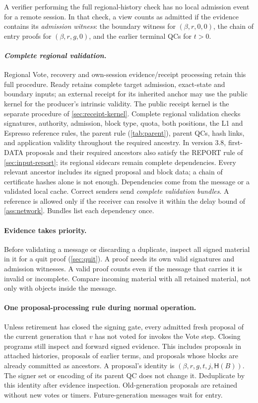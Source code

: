 \documentclass[11pt,a4paper]{article}
\newcommand{\Hash}{\mathsf H}
\newcommand{\defterm}[1]{\textcolor{rrBlue}{\textit{#1}}}
\begin{document}
A verifier performing the full regional-history check has no local
admission event for a remote session. In that check, a view counts as
admitted if the evidence contains
its \defterm{admission witness}: the boundary witness for $(\beta,r,0,0)$, the chain of
entry proofs for $(\beta,r,g,0)$, and the earlier terminal QCs for $t>0$.

\paragraph{\defterm{Complete regional validation.}}
Regional Vote, recovery and own-session evidence/receipt processing
retain this full procedure. Ready retains complete target admission,
exact-state and boundary inputs; an external receipt for its inherited
anchor may use the public kernel for the producer's intrinsic validity.
The public receipt kernel is the separate procedure of
\cref{sec:receipt-kernel}. Complete regional validation checks signatures, authority, admission, block type, quota,
both positions, the L1 and Espresso reference rules, the parent rule
(\cref{tab:parent}), parent QCs, hash links, and application validity
throughout the required ancestry. In version 3.8, first-DATA proposals
and their required ancestors also satisfy the REPORT rule of
\cref{sec:input-report}; its regional sidecars remain complete dependencies.
Every relevant ancestor includes its
signed proposal and block data; a chain of certificate hashes alone is
not enough. Dependencies come from the message or a validated local
cache. Correct senders send \defterm{complete validation bundles}. A reference is
allowed only if the receiver can resolve it within the delay bound of
\cref{ass:network}. Bundles list each dependency once.

\paragraph{Evidence takes priority.}
Before validating a message or discarding a duplicate, inspect all signed
material in it for a quit proof (\cref{sec:quit}). A proof needs its own
valid signatures and admission witnesses. A valid proof counts even if
the message that carries it is invalid or incomplete. Compare incoming
material with all retained material, not only with objects inside the
message.

\paragraph{One proposal-processing rule during normal operation.}
Unless retirement has closed the signing gate, every admitted fresh
proposal of the current generation that $v$ has not voted for invokes the
Vote step. Closing programs still inspect and forward signed evidence. This includes proposals in attached
histories, proposals of earlier terms, and proposals whose blocks are
already committed as ancestors. A proposal's identity is
$(\beta,r,g,t,j,\Hash(B))$. The signer set or encoding of its parent QC does
not change it. Deduplicate by this identity after evidence inspection.
Old-generation proposals are retained without new votes or timers.
Future-generation messages wait for entry.
\end{document}
